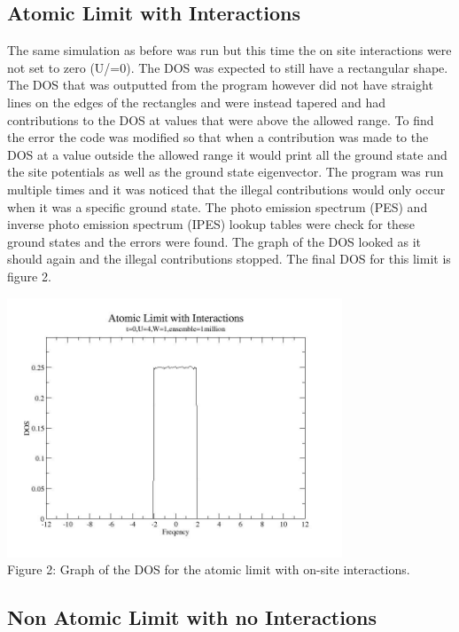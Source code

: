 \documentclass{article}
\begin{document}
\subsection*{Atomic Limit with Interactions}

The same simulation as before was run but this time the on site interactions were not set to zero (U/=0). The DOS was expected to still have a rectangular shape. The DOS that was outputted from the program however did not have straight lines on the edges of the rectangles and were instead tapered and had contributions to the DOS at values that were above the allowed range. To find the error the code was modified so that when a contribution was made to the DOS at a value outside the allowed range it would print all the ground state and the site potentials as well as the ground state eigenvector. The program was run multiple times and it was noticed that the illegal contributions would only occur when it was a specific ground state. The photo emission spectrum (PES) and inverse photo emission spectrum (IPES) lookup tables were check for these ground states and the errors were found. The graph of the DOS looked as it should again and the illegal contributions stopped. The final DOS for this limit is figure 2.

\begin{center}
\includegraphics [width=10cm]{dos_t0u4w12.jpg} \\
Figure 2: Graph of the DOS for the atomic limit with on-site interactions. 
\end{center}
\smallskip

\subsection*{Non Atomic Limit with no Interactions}
\end{document}
